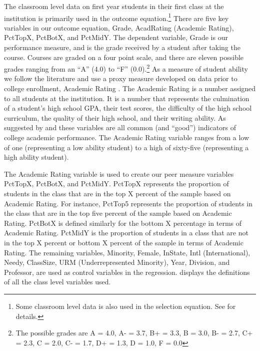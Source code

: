 The classroom level data on first year students in their first class at the institution is primarily used in the outcome equation.\footnote{Some classroom level data is also used in the selection equation. See  for details.}
There are five key variables in our outcome equation, Grade, AcadRating (Academic Rating), PctTopX, PctBotX, and PctMidY. 
The dependent variable, Grade is our performance measure, and is the grade received by a student after taking the course. 
Courses are graded on a four point scale, and there are eleven possible grades ranging from an ``A'' (4.0) to ``F'' (0.0).\footnote{The possible grades are A = 4.0, A- = 3.7, B+ = 3.3, B = 3.0, B- = 2.7, C+ = 2.3, C = 2.0, C- = 1.7, D+ = 1.3, D = 1.0, F = 0.0} 
As a measure of student ability we follow the literature and use a proxy measure developed on data prior to college enrollment, Academic Rating \citep{griffith2014peer,smith2015new}. 
The Academic Rating is a number assigned to all students at the institution. 
It is a number that represents the culmination of a student's high school GPA, their test scores, the difficulty of the high school curriculum, the quality of their high school, and their writing ability. 
As suggested by \citet{betts2003determinants} and \citet{dooley2012persistence} these variables are all common (and ``good'') indicators of college academic performance.
The Academic Rating variable ranges from a low of one (representing a low ability student) to a high of sixty-five (representing a high ability student).

The Academic Rating variable is used to create our peer measure variables PctTopX, PctBotX, and PctMidY. 
PctTopX represents the proportion of students in the class that are in the top X percent of the sample based on Academic Rating. 
For instance, PctTop5 represents the proportion of students in the class that are in the top five percent of the sample based on Academic Rating.
PctBotX is defined similarly for the bottom X percentage in terms of Academic Rating. 
PctMidY is the proportion of students in a class that are not in the top X percent or bottom X percent of the sample in terms of Academic Rating. 
The remaining variables, Minority, Female, InState, Intl (International), Needy, ClassSize, URM (Underrepresented Minority), Year, Division, and Professor, are used as control variables in the regression.
 displays the definitions of all the class level variables used. 

\bigskip

